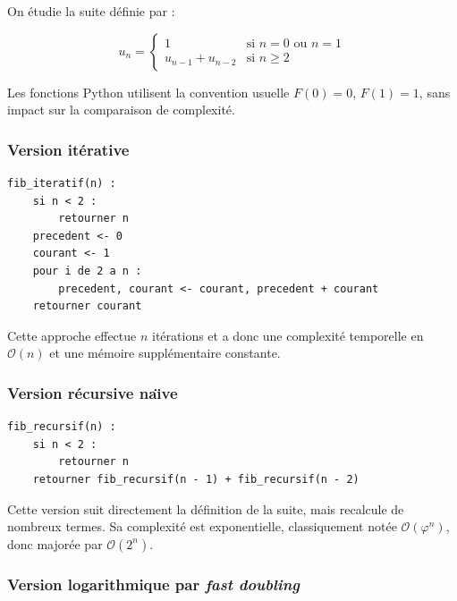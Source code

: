 On \'{e}tudie la suite d\'{e}finie par :

\[
	u_n =
	\begin{cases}
		1                 & \text{si } n = 0 \text{ ou } n = 1 \\
		u_{n-1} + u_{n-2} & \text{si } n \geq 2
	\end{cases}
\]

Les fonctions Python utilisent la convention usuelle
\(F(0)=0\), \(F(1)=1\), sans impact sur la comparaison de complexit\'{e}.

\subsubsection{Version it\'{e}rative}\label{subsubsec:tp1-fibonacci-iteratif}

\begin{lstlisting}[basicstyle=\ttfamily,label={lst:tp1-fibonacci-iteratif}]
fib_iteratif(n) :
    si n < 2 :
        retourner n
    precedent <- 0
    courant <- 1
    pour i de 2 a n :
        precedent, courant <- courant, precedent + courant
    retourner courant
\end{lstlisting}

Cette approche effectue \(n\) it\'{e}rations et a donc une complexit\'{e}
temporelle en \(\mathcal{O}(n)\) et une m\'{e}moire suppl\'{e}mentaire constante.

\subsubsection{Version r\'{e}cursive na\"{\i}ve}\label{subsubsec:tp1-fibonacci-recursif}

\begin{lstlisting}[basicstyle=\ttfamily,label={lst:tp1-fibonacci-recursif}]
fib_recursif(n) :
    si n < 2 :
        retourner n
    retourner fib_recursif(n - 1) + fib_recursif(n - 2)
\end{lstlisting}

Cette version suit directement la d\'{e}finition de la suite, mais recalcule de
nombreux termes.
Sa complexit\'{e} est exponentielle, classiquement not\'{e}e
\(\mathcal{O}(\varphi^n)\), donc major\'{e}e par \(\mathcal{O}(2^n)\).

\subsubsection{Version logarithmique par \emph{fast doubling}}\label{subsubsec:tp1-fibonacci-logarithmique}

